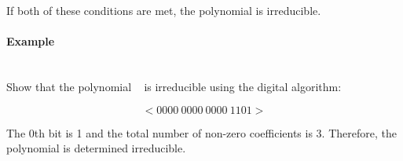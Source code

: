     If both of these conditions are met, the polynomial is irreducible.

    \paragraph{Example} \leavevmode \\ Show that the polynomial
    \examplepoly~ is irreducible using the digital algorithm:

        \[ <0000 \ 0000 \ 0000 \ 1101> \]

    The 0th bit is 1 and the total number of non-zero coefficients is
    3. Therefore, the polynomial is determined irreducible.

\newpage


